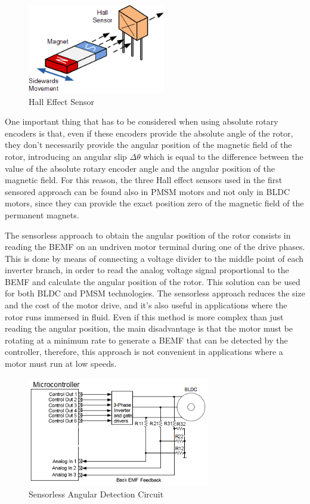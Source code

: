 \begin{figure}[htbp]
\centering
\includegraphics[width=6cm]{Images/hall_effect.png} 
\caption[Hall Effect Sensor]{Hall Effect Sensor}
\label{fig:hall_effect}
\end{figure}

One important thing that has to be considered when using absolute rotary encoders is that, even if these encoders provide the absolute angle of the rotor, they don't necessarily provide the angular position of the magnetic field of the rotor, introducing an angular slip $\Delta \theta$ which is equal to the difference between the value of the absolute rotary encoder angle and the angular position of the magnetic field. For this reason, the three Hall effect sensors used in the first sensored approach can be found also in \ac{PMSM} motors and not only in \ac{BLDC} motors, since they can provide the exact position zero of the magnetic field of the permanent magnets.

The sensorless approach to obtain the angular position of the rotor consists in reading the \ac{BEMF} on an undriven motor terminal during one of the drive phases. This is done by means of connecting a voltage divider to the middle point of each inverter branch, in order to read the analog voltage signal proportional to the \ac{BEMF} and calculate the angular position of the rotor. This solution can be used for both \ac{BLDC} and \ac{PMSM} technologies. The sensorless approach reduces the size and the cost of the motor drive, and it's also useful in applications where the rotor runs immersed in fluid. Even if this method is more complex than just reading the angular position, the main disadvantage is that the motor must be rotating at a minimum rate to generate a \ac{BEMF} that can be detected by the controller, therefore, this approach is not convenient in applications where a motor must run at low speeds.

\begin{figure}[htbp]
\centering
\includegraphics[width=8cm]{Images/sensorless_position.png} 
\caption[Sensorless Angular Detection]{Sensorless Angular Detection Circuit}
\label{fig:hall_effect}
\end{figure}


